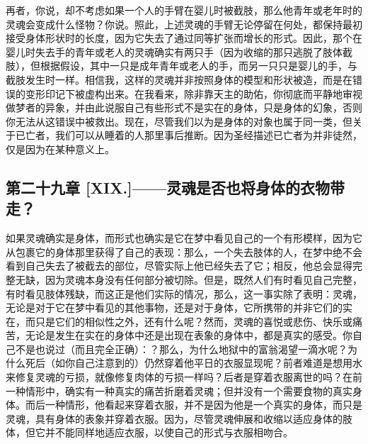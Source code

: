 再者，你说，却不考虑如果一个人的手臂在婴儿时被截肢，那么他青年或老年时的灵魂会变成什么怪物？你说。照此，上述灵魂的手臂无论停留在何处，都保持最初接受身体形状时的长度，因为它失去了通过同等扩张而增长的形式。因此，那个在婴儿时失去手的青年或老人的灵魂确实有两只手（因为收缩的那只逃脱了肢体截肢），但根据假设，其中一只是成年青年或老人的手，而另一只只是婴儿的手，与截肢发生时一样。相信我，这样的灵魂并非按照身体的模型和形状被造，而是在错误的变形印记下被虚构出来。在我看来，除非靠天主的助佑，你彻底而平静地审视做梦者的异象，并由此说服自己有些形式不是实在的身体，只是身体的幻象，否则你无法从这错误中被救出。现在，尽管我们以为是身体的对象也属于同一类，但关于已亡者，我们可以从睡着的人那里事后推断。因为圣经描述已亡者为并非徒然， 仅是因为在某种意义上。\par


\subsection{第二十九章 [XIX.]——灵魂是否也将身体的衣物带走？}

如果灵魂确实是身体，而形式也确实是它在梦中看见自己的一个有形模样，因为它从包裹它的身体那里获得了自己的表现：那么，一个失去肢体的人，在梦中绝不会看到自己失去了被截去的部位，尽管实际上他已经失去了它；相反，他总会显得完整无缺，因为灵魂本身没有任何部分被切除。但是，既然人们有时看见自己完整，有时看见肢体残缺，而这正是他们实际的情况，那么，这一事实除了表明：灵魂，无论是对于它在梦中看见的其他事物，还是对于身体，它所携带的并非它们的实在，而只是它们的相似性之外，还有什么呢？然而，灵魂的喜悦或悲伤、快乐或痛苦，无论是发生在实在的身体中还是出现在表象的身体中，都是真实的感受。你自己不是也说过（而且完全正确）：？那么，为什么地狱中的富翁渴望一滴水呢？为什么死后（如你自己注意到的）仍然穿着他平日的衣服显现呢？前者难道是想用水来修复灵魂的亏损，就像修复肉体的亏损一样吗？后者是穿着衣服离世的吗？在前一种情形中，确实有一种真实的痛苦折磨着灵魂；但并没有一个需要食物的真实身体。而后一种情形，他看起来穿着衣服，并不是因为他是一个真实的身体，而只是灵魂，具有身体的表象并穿着衣服。因为，尽管灵魂伸展和收缩以适应身体的肢体，但它并不能同样地适应衣服，以使自己的形式与衣服相吻合。\par


